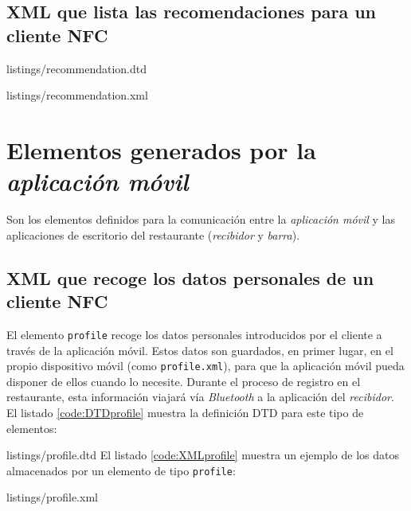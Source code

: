 \subsection{\acs{XML} que lista las recomendaciones para un cliente \acs{NFC}}

{listings/recommendation.dtd}

{listings/recommendation.xml}

\section{Elementos generados por la \emph{aplicación móvil}}
Son los elementos definidos para la comunicación entre la \emph{aplicación
móvil} y las aplicaciones de escritorio del restaurante (\emph{recibidor} y
\emph{barra}).
\subsection{\acs{XML} que recoge los datos personales de un cliente \acs{NFC}}
El elemento \texttt{profile} recoge los datos personales introducidos por el
cliente a través de la aplicación móvil. Estos datos son guardados, en primer
lugar, en el propio dispositivo móvil (como \texttt{profile.xml}), para que la
aplicación móvil pueda disponer de ellos cuando lo necesite. Durante el
proceso de registro en el restaurante, esta información viajará vía
\emph{Bluetooth} a la aplicación del \emph{recibidor}. El listado
\ref{code:DTDprofile} muestra la definición \acs{DTD} para este tipo de
elementos:

{listings/profile.dtd}
El listado \ref{code:XMLprofile} muestra un ejemplo de los datos almacenados
por un elemento de tipo \texttt{profile}:

{listings/profile.xml}

